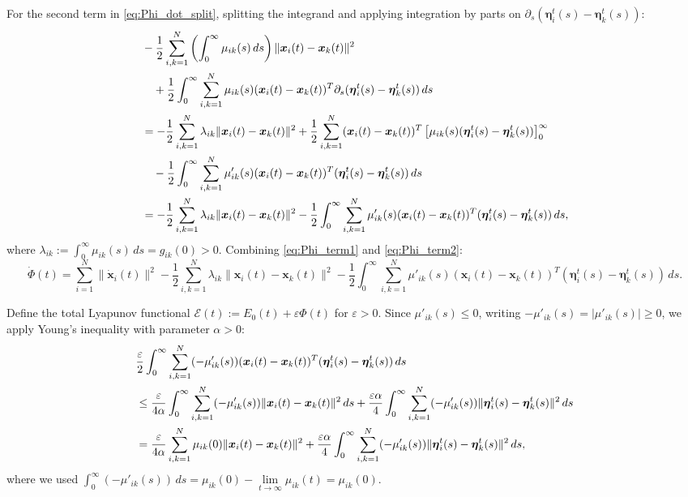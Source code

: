 \documentclass[11pt]{amsart}
\numberwithin{equation}{section}
\begin{document}
For the second term in \eqref{eq:Phi_dot_split}, splitting the integrand and applying integration by parts on $\partial_s(\boldsymbol{\eta}_i^t(s)-\boldsymbol{\eta}_k^t(s))$:
{\small
\begin{align}\label{eq:Phi_term2}
&-\frac{1}{2}\sum_{i,k=1}^N \left(\int_0^\infty \mu_{ik}(s)\,ds\right) \|\boldsymbol{x}_i(t)-\boldsymbol{x}_k(t)\|^2 \notag \\
&\quad + \frac{1}{2}\int_0^\infty \sum_{i,k=1}^N \mu_{ik}(s) (\boldsymbol{x}_i(t)-\boldsymbol{x}_k(t))^T \partial_s (\boldsymbol{\eta}_i^t(s)-\boldsymbol{\eta}_k^t(s))\,ds \notag \\
&= -\frac{1}{2}\sum_{i,k=1}^N \lambda_{ik} \|\boldsymbol{x}_i(t)-\boldsymbol{x}_k(t)\|^2 + \frac{1}{2}\sum_{i,k=1}^N (\boldsymbol{x}_i(t)-\boldsymbol{x}_k(t))^T \left[ \mu_{ik}(s)(\boldsymbol{\eta}_i^t(s)-\boldsymbol{\eta}_k^t(s)) \right]_0^\infty \notag \\
&\quad - \frac{1}{2}\int_0^\infty \sum_{i,k=1}^N \mu'_{ik}(s) (\boldsymbol{x}_i(t)-\boldsymbol{x}_k(t))^T (\boldsymbol{\eta}_i^t(s)-\boldsymbol{\eta}_k^t(s))\,ds \notag \\
&= -\frac{1}{2}\sum_{i,k=1}^N \lambda_{ik} \|\boldsymbol{x}_i(t)-\boldsymbol{x}_k(t)\|^2 - \frac{1}{2}\int_0^\infty \sum_{i,k=1}^N \mu'_{ik}(s) (\boldsymbol{x}_i(t)-\boldsymbol{x}_k(t))^T (\boldsymbol{\eta}_i^t(s)-\boldsymbol{\eta}_k^t(s))\,ds,
\end{align}
}
where $\lambda_{ik} := \int_0^\infty \mu_{ik}(s)\,ds = g_{ik}(0) > 0$. Combining \eqref{eq:Phi_term1} and \eqref{eq:Phi_term2}:
{\small
\begin{equation*}\label{eq:Phi_dot_final}
\dot{\Phi}(t) = \sum_{i=1}^N \|\dot{\boldsymbol{x}}_i(t)\|^2 - \frac{1}{2}\sum_{i,k=1}^N \lambda_{ik}\|\boldsymbol{x}_i(t)-\boldsymbol{x}_k(t)\|^2 - \frac{1}{2}\int_0^\infty \sum_{i,k=1}^N \mu'_{ik}(s)(\boldsymbol{x}_i(t)-\boldsymbol{x}_k(t))^T(\boldsymbol{\eta}_i^t(s)-\boldsymbol{\eta}_k^t(s))\,ds.
\end{equation*}
}

Define the total Lyapunov functional $\mathcal{E}(t) := E_0(t) + \varepsilon \Phi(t)$ for $\varepsilon > 0$. Since $\mu'_{ik}(s) \le 0$, writing $-\mu'_{ik}(s) = |\mu'_{ik}(s)| \ge 0$, we apply Young's inequality with parameter $\alpha > 0$:
{\small
\begin{align}\label{eq:cross_bound}
&\frac{\varepsilon}{2}\int_0^\infty \sum_{i,k=1}^N (-\mu'_{ik}(s))(\boldsymbol{x}_i(t)-\boldsymbol{x}_k(t))^T(\boldsymbol{\eta}_i^t(s)-\boldsymbol{\eta}_k^t(s))\,ds \notag \\
&\le \frac{\varepsilon}{4\alpha}\int_0^\infty \sum_{i,k=1}^N (-\mu'_{ik}(s)) \|\boldsymbol{x}_i(t)-\boldsymbol{x}_k(t)\|^2\,ds + \frac{\varepsilon\alpha}{4} \int_0^\infty \sum_{i,k=1}^N (-\mu'_{ik}(s)) \|\boldsymbol{\eta}_i^t(s)-\boldsymbol{\eta}_k^t(s)\|^2\,ds \notag \\
&= \frac{\varepsilon}{4\alpha} \sum_{i,k=1}^N \mu_{ik}(0) \|\boldsymbol{x}_i(t)-\boldsymbol{x}_k(t)\|^2 + \frac{\varepsilon\alpha}{4} \int_0^\infty \sum_{i,k=1}^N (-\mu'_{ik}(s)) \|\boldsymbol{\eta}_i^t(s)-\boldsymbol{\eta}_k^t(s)\|^2\,ds,
\end{align}
}
where we used $\int_0^\infty (-\mu'_{ik}(s))\,ds = \mu_{ik}(0) - \lim\limits_{t\rightarrow\infty}\mu_{ik}(t) = \mu_{ik}(0)$.
\end{document}
